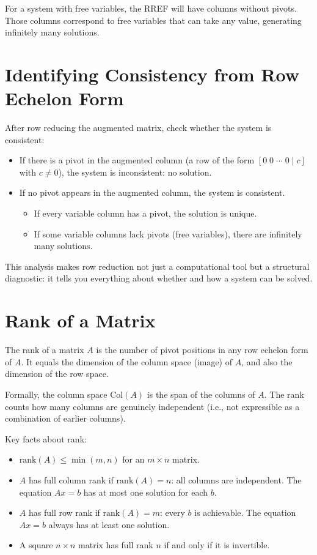 \documentclass[11pt]{article}
\begin{document}
For a system with free variables, the RREF will have columns without pivots. Those columns correspond to free variables that can take any value, generating infinitely many solutions.

\section*{Identifying Consistency from Row Echelon Form}

After row reducing the augmented matrix, check whether the system is consistent:
\begin{itemize}
  \item If there is a pivot in the augmented column (a row of the form $[0 \; 0 \; \cdots \; 0 \mid c]$ with $c \neq 0$), the system is inconsistent: no solution.
  \item If no pivot appears in the augmented column, the system is consistent.
    \begin{itemize}
      \item If every variable column has a pivot, the solution is unique.
      \item If some variable columns lack pivots (free variables), there are infinitely many solutions.
    \end{itemize}
\end{itemize}

This analysis makes row reduction not just a computational tool but a structural diagnostic: it tells you everything about whether and how a system can be solved.

\section*{Rank of a Matrix}

The rank of a matrix $A$ is the number of pivot positions in any row echelon form of $A$. It equals the dimension of the column space (image) of $A$, and also the dimension of the row space.

Formally, the column space $\text{Col}(A)$ is the span of the columns of $A$. The rank counts how many columns are genuinely independent (i.e., not expressible as a combination of earlier columns).

Key facts about rank:
\begin{itemize}
  \item $\text{rank}(A) \leq \min(m, n)$ for an $m \times n$ matrix.
  \item $A$ has full column rank if $\text{rank}(A) = n$: all columns are independent. The equation $Ax = b$ has at most one solution for each $b$.
  \item $A$ has full row rank if $\text{rank}(A) = m$: every $b$ is achievable. The equation $Ax = b$ always has at least one solution.
  \item A square $n \times n$ matrix has full rank $n$ if and only if it is invertible.
\end{itemize}
\end{document}
